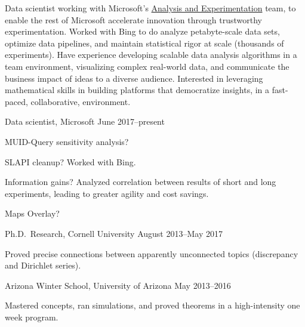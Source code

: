 \documentclass[11pt, letterpaper]{awesome-cv}
\begin{document}
\makecvheader






\begin{cvparagraph}
Data scientist working with Microsoft's \href{http://www.exp-platform.com/}{Analysis and Experimentation} team, to enable the rest of Microsoft accelerate innovation through trustworthy experimentation. Worked with Bing to do analyze petabyte-scale data sets, optimize data pipelines, and maintain statistical rigor at scale (thousands of experiments). Have experience developing scalable data analysis algorithms in a team environment, visualizing complex real-world data, and communicate the business impact of ideas to a diverse audience. Interested in leveraging mathematical skills in building platforms that democratize insights, in a fast-paced, collaborative, environment.
\end{cvparagraph}






\begin{cventries}

\cventry
	{Data scientist, Microsoft}
	{}{}
	{June 2017--present}
	{
		\begin{cvitems}
			\item{MUID-Query sensitivity analysis?}
			\item{SLAPI cleanup? Worked with Bing.}
			\item{Information gains? Analyzed correlation between results of short and long experiments, leading to greater agility and cost savings.}
			\item{Maps Overlay?}
		\end{cvitems}
	}

\cventry
	{Ph.D.~Research, Cornell University}
	{}{}
	{August 2013--May 2017}
	{
		\begin{cvitems}
			\item{Proved precise connections between apparently unconnected topics (discrepancy and Dirichlet series).}
		\end{cvitems}
	}
		
\cventry
	{Arizona Winter School, University of Arizona}
	{}{}
	{May 2013--2016}
	{
		\begin{cvitems}
			\item{Mastered concepts, ran simulations, and proved theorems in a high-intensity one week program.}
		\end{cvitems}
	}
\end{cventries}
\end{document}
